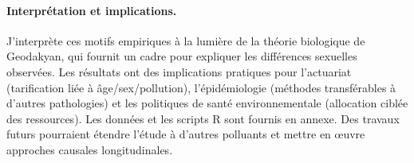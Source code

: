 \paragraph{Interprétation et implications.} J’interprète ces motifs empiriques à la lumière de la théorie biologique de Geodakyan, qui fournit un cadre pour expliquer les différences sexuelles observées. Les résultats ont des implications pratiques pour l’actuariat (tarification liée à âge/sex/pollution), l’épidémiologie (méthodes transférables à d’autres pathologies) et les politiques de santé environnementale (allocation ciblée des ressources). Les données et les scripts R sont fournis en annexe. Des travaux futurs pourraient étendre l’étude à d’autres polluants et mettre en œuvre approches causales longitudinales.

